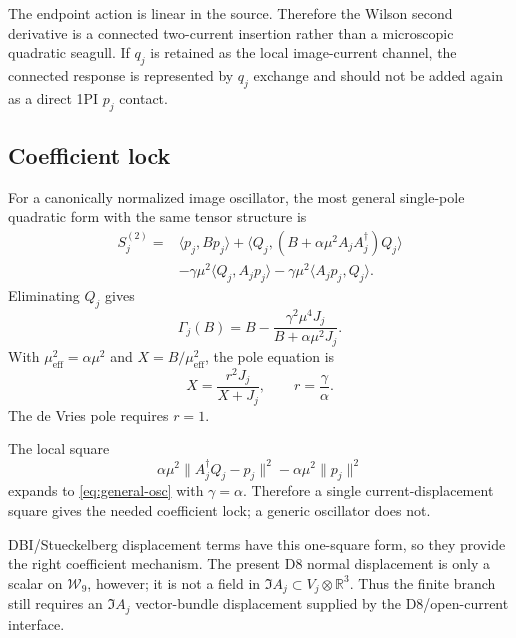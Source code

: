 \documentclass[11pt]{article}
\newcommand{\RR}{\mathbb{R}}
\newcommand{\WW}{\mathcal{W}}
\newcommand{\eff}{\mathrm{eff}}
\theoremstyle{plain}
\theoremstyle{definition}
\begin{document}
The endpoint action is linear in the source.  Therefore the Wilson second
derivative is a connected two-current insertion rather than a microscopic
quadratic seagull.  If \(q_j\) is retained as the local image-current channel,
the connected response is represented by \(q_j\) exchange and should not be
added again as a direct 1PI \(p_j\) contact.

\subsection*{Coefficient lock}

For a canonically normalized image oscillator, the most general single-pole
quadratic form with the same tensor structure is
\begin{equation}
\begin{split}
  S_j^{(2)}
  ={}&\langle p_j,Bp_j\rangle
  +\langle Q_j,(B+\alpha\mu^2A_jA_j^\dagger)Q_j\rangle\\
  &-\gamma\mu^2\langle Q_j,A_jp_j\rangle
  -\gamma\mu^2\langle A_jp_j,Q_j\rangle .
  \label{eq:general-osc}
\end{split}
\end{equation}
Eliminating \(Q_j\) gives
\begin{equation}
  \Gamma_j(B)
  =
  B-\frac{\gamma^2\mu^4J_j}{B+\alpha\mu^2J_j}.
  \label{eq:general-gamma}
\end{equation}
With \(\mu_{\eff}^2=\alpha\mu^2\) and \(X=B/\mu_{\eff}^2\), the pole equation is
\begin{equation}
  X=\frac{r^2J_j}{X+J_j},
  \qquad r=\frac{\gamma}{\alpha}.
  \label{eq:r-ratio}
\end{equation}
The de Vries pole requires \(r=1\).

The local square
\begin{equation}
  \alpha\mu^2\|A_j^\dagger Q_j-p_j\|^2
  -\alpha\mu^2\|p_j\|^2
  \label{eq:single-square}
\end{equation}
expands to \eqref{eq:general-osc} with \(\gamma=\alpha\).  Therefore a single
current-displacement square gives the needed coefficient lock; a generic
oscillator does not.

DBI/Stueckelberg displacement terms have this one-square form, so they provide
the right coefficient mechanism.  The present D8 normal displacement is only a
scalar on \(\WW_9\), however; it is not a field in
\(\Im A_j\subset V_j\otimes\RR^3\).  Thus the finite branch still requires an
\(\Im A_j\) vector-bundle displacement supplied by the D8/open-current
interface.
\end{document}
